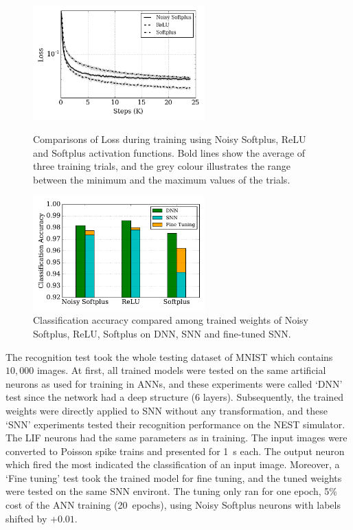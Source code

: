 \documentclass{article}
\begin{document}
\begin{figure}
	\begin{minipage}[t]{0.48\linewidth}
		\raggedleft
		\includegraphics[width=2.6in]{pics_iconip/8.png}
		\caption{Comparisons of Loss during training using Noisy Softplus, ReLU and Softplus activation functions. Bold lines show the average of three training trials, and the grey colour illustrates the range between the minimum and the maximum values of the trials. }
		\label{Fig:loss_ns}
	\end{minipage}%
    \hspace{0.04\linewidth}
	\begin{minipage}[t]{0.48\linewidth}
		\raggedright
		\includegraphics[width=2.6in]{pics_iconip/9-2.pdf}
		\caption{Classification accuracy compared among trained weights of Noisy Softplus, ReLU, Softplus on DNN, SNN and fine-tuned SNN.}
		\label{Fig:result_bar}
	\end{minipage}
\end{figure}

The recognition test took the whole testing dataset of MNIST which contains $10,000$ images.
At first, all trained models were tested on the same artificial neurons as used for training in ANNs, and these experiments were called `DNN' test since the network had a deep structure (6 layers).
Subsequently, the trained weights were directly applied to SNN without any transformation, and these `SNN' experiments tested their recognition performance on the NEST simulator.
The LIF neurons had the same parameters as in training.
The input images were converted to Poisson spike trains and presented for 1~s each.
The output neuron which fired the most indicated the classification of an input image.
Moreover, a `Fine tuning' test took the trained model for fine tuning, and the tuned weights were tested on the same SNN environt.
The tuning only ran for one epoch, 5\% cost of the ANN training (20~epochs), using Noisy Softplus neurons with labels shifted by $+0.01$.
\end{document}
